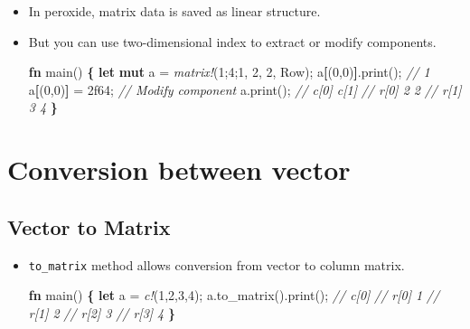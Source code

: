 \documentclass[]{book}
\newenvironment{Shaded}{\begin{snugshade}}{\end{snugshade}}
\newcommand{\CommentTok}[1]{\textcolor[rgb]{0.56,0.35,0.01}{\textit{#1}}}
\newcommand{\DecValTok}[1]{\textcolor[rgb]{0.00,0.00,0.81}{#1}}
\newcommand{\KeywordTok}[1]{\textcolor[rgb]{0.13,0.29,0.53}{\textbf{#1}}}
\newcommand{\NormalTok}[1]{#1}
\newcommand{\OperatorTok}[1]{\textcolor[rgb]{0.81,0.36,0.00}{\textbf{#1}}}
\newcommand{\PreprocessorTok}[1]{\textcolor[rgb]{0.56,0.35,0.01}{\textit{#1}}}
\begin{document}
\begin{itemize}
\item
  In peroxide, matrix data is saved as linear structure.
\item
  But you can use two-dimensional index to extract or modify components.

\begin{Shaded}
\begin{Highlighting}[]
\KeywordTok{fn}\NormalTok{ main() }\OperatorTok{\{}
    \KeywordTok{let} \KeywordTok{mut}\NormalTok{ a = }\PreprocessorTok{matrix!}\NormalTok{(}\DecValTok{1}\NormalTok{;}\DecValTok{4}\NormalTok{;}\DecValTok{1}\NormalTok{, }\DecValTok{2}\NormalTok{, }\DecValTok{2}\NormalTok{, Row);}
\NormalTok{    a}\OperatorTok{[}\NormalTok{(}\DecValTok{0}\NormalTok{,}\DecValTok{0}\NormalTok{)}\OperatorTok{]}\NormalTok{.print(); }\CommentTok{// 1}
\NormalTok{    a}\OperatorTok{[}\NormalTok{(}\DecValTok{0}\NormalTok{,}\DecValTok{0}\NormalTok{)}\OperatorTok{]}\NormalTok{ = }\DecValTok{2f64}\NormalTok{; }\CommentTok{// Modify component}
\NormalTok{    a.print();}
    \CommentTok{//       c[0] c[1]}
    \CommentTok{//  r[0]    2    2}
    \CommentTok{//  r[1]    3    4}
\OperatorTok{\}}
\end{Highlighting}
\end{Shaded}
\end{itemize}

\hypertarget{conversion-between-vector}{%
\section{Conversion between vector}\label{conversion-between-vector}}

\hypertarget{vector-to-matrix}{%
\subsection{Vector to Matrix}\label{vector-to-matrix}}

\begin{itemize}
\item
  \texttt{to\_matrix} method allows conversion from vector to column matrix.

\begin{Shaded}
\begin{Highlighting}[]
\KeywordTok{fn}\NormalTok{ main() }\OperatorTok{\{}
    \KeywordTok{let}\NormalTok{ a = }\PreprocessorTok{c!}\NormalTok{(}\DecValTok{1}\NormalTok{,}\DecValTok{2}\NormalTok{,}\DecValTok{3}\NormalTok{,}\DecValTok{4}\NormalTok{);}
\NormalTok{    a.to_matrix().print();}
    \CommentTok{//      c[0]}
    \CommentTok{// r[0]    1}
    \CommentTok{// r[1]    2}
    \CommentTok{// r[2]    3}
    \CommentTok{// r[3]    4}
\OperatorTok{\}}
\end{Highlighting}
\end{Shaded}
\end{itemize}
\end{document}
